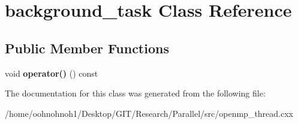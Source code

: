 \hypertarget{classbackground__task}{}\section{background\+\_\+task Class Reference}
\label{classbackground__task}
\subsection*{Public Member Functions}
\begin{DoxyCompactItemize}
\item 
\mbox{\label{classbackground__task_a116a774b35cf02ea68022f0be37f2ce9}} 
void {\bfseries operator()} () const
\end{DoxyCompactItemize}


The documentation for this class was generated from the following file\+:\begin{DoxyCompactItemize}
\item 
/home/oohnohnoh1/\+Desktop/\+G\+I\+T/\+Research/\+Parallel/src/openmp\+\_\+thread.\+cxx\end{DoxyCompactItemize}
